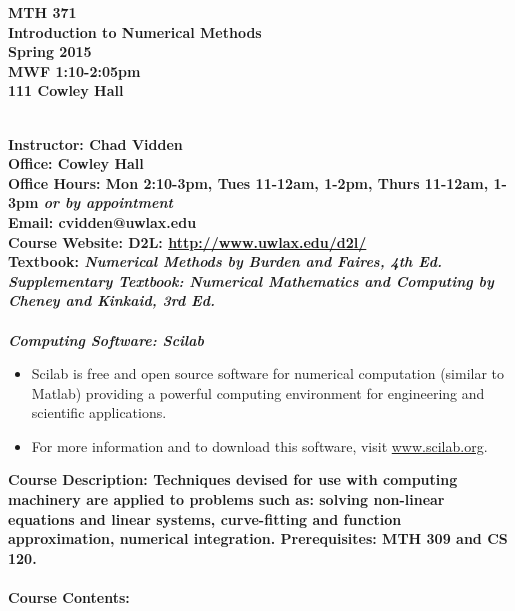 \documentclass [10pt]{article}
\begin{document}
\begin {center}
\Large \bfseries MTH 371 \\
Introduction to Numerical Methods \normalfont \normalsize \\
Spring 2015 \\
MWF 1:10-2:05pm \\
111 Cowley Hall
\end {center}
\ \\
\noindent
\bfseries Instructor: \normalfont Chad Vidden \\
\bfseries Office:  Cowley Hall \\
\bfseries Office Hours: \normalfont Mon 2:10-3pm, Tues 11-12am, 1-2pm, Thurs 11-12am, 1-3pm \emph{or by appointment} \\
\bfseries Email: \normalfont cvidden@uwlax.edu \\
\bfseries Course Website: \normalfont D2L: \url{http://www.uwlax.edu/d2l/}\\
\bfseries Textbook: \normalfont \itshape Numerical Methods \normalfont by Burden and Faires, 4th Ed. \\
\bfseries Supplementary Textbook: \normalfont \itshape Numerical Mathematics and Computing \normalfont by Cheney and Kinkaid, 3rd Ed. \\
\ \\
\bfseries Computing Software: \normalfont Scilab \vspace{-3mm} 
\begin{itemize}
\setlength{\itemsep}{1pt}
\setlength{\parskip}{0pt}
\setlength{\parsep}{0pt}
\item Scilab is free and open source software for numerical computation (similar to Matlab) providing a powerful computing environment for engineering and scientific applications. 
\item For more information and to download this software, visit \url{www.scilab.org}.
\end{itemize} 
\noindent
\bfseries Course Description: \normalfont Techniques devised for use with computing machinery are applied to problems such as: solving non-linear equations and linear systems, curve-fitting and function approximation, numerical integration.  Prerequisites: MTH 309 and CS 120. \\
\ \\
\bfseries Course Contents: \normalfont   \vspace{-3mm} 
\end{document}
